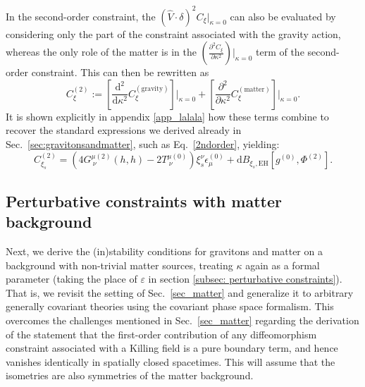 \documentclass[]{jkpaper}
\theoremstyle{plain}
\theoremstyle{definition}
\newcommand{\fins}{\cdot}
\newcommand{\sd}{\mathrm {d}}
\newcommand{\fd}{\delta}
\begin{document}
In the second-order constraint, the $(\hat{V}\fins\fd)^2C_\xi|_{\kappa=0}$ can also be evaluated by considering only the part of the constraint associated with the gravity action, whereas the only role of the matter is in the $\left(\frac{\partial^2 C_\xi}{\partial\kappa^2}\right)\big|_{\kappa=0}$ term of the second-order constraint.  This can then be rewritten as
\begin{equation}
    C^{(2)}_{\xi}:=
    \left[\frac{\sd^2}{\sd\kappa^2} C^{(\text{gravity})}_\xi\right]\big|_{\kappa=0}+\left[\frac{\partial^2}{\partial\kappa^2} C^{(\text{matter})}_\xi\right]\big|_{\kappa=0}.
\end{equation}
It is shown explicitly in appendix \ref{app_lalala} how these terms combine to recover the standard expressions we derived already in Sec.~\ref{sec:gravitonsandmatter}, such as Eq.~\eqref{2ndorder}, yielding:
\begin{equation}
    C^{(2)}_{\xi_s}=\left(4G^{\mu(2)}_{~\nu}(h,h)-2 T^{\mu(0)}_{~\nu}\right)\xi_s^\nu\epsilon^{(0)}_{\mu}
      +\sd B_{\xi_s,\text{EH}}\left[g^{(0)},\Phi^{(2)}\right].
\end{equation}









\subsection{Perturbative constraints with matter background}

Next, we derive the (in)stability conditions for gravitons and matter on a background with non-trivial matter sources, treating $\kappa$ again as a formal parameter (taking the place of $\varepsilon$ in section \ref{subsec: perturbative constraints}). That is, we revisit the setting of Sec.~\ref{sec_matter} and generalize it to arbitrary generally covariant theories using the covariant phase space formalism. This overcomes the challenges mentioned in Sec.~\ref{sec_matter} regarding the derivation of the statement that the first-order contribution of any diffeomorphism constraint associated with a Killing field is a pure boundary term, and hence vanishes identically in spatially closed spacetimes. This will assume that the isometries are also symmetries of the matter background.
\end{document}
